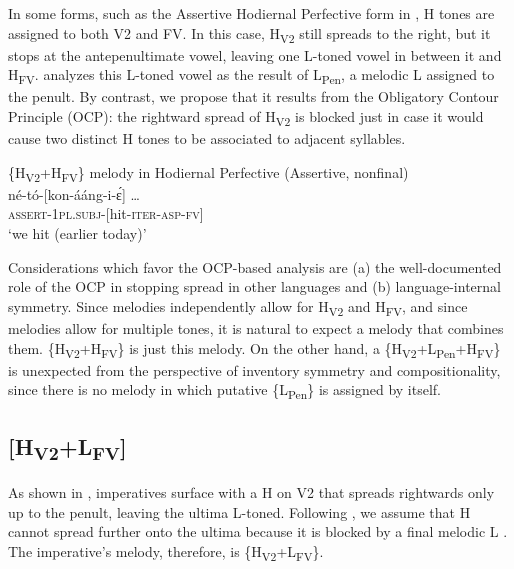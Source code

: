 \documentclass[output=paper,newtxmath,modfonts,nonflat,hidelinks]{langsci/langscibook}
\begin{document}
In some forms, such as the Assertive Hodiernal Perfective form in , H tones are assigned to both V2 and FV. In this case, H\textsubscript{V2} still spreads to the right, but it stops at the antepenultimate vowel, leaving one L-toned vowel in between it and H\textsubscript{FV}. \citet{Roberts-Kohno2014} analyzes this L-toned vowel as the result of L\textsubscript{Pen}, a melodic L  assigned to the penult. By contrast, we propose that it results from the Obligatory Contour Principle (OCP):  the rightward spread of H\textsubscript{V2} is blocked just in case it would cause two distinct H tones to be associated to adjacent syllables.

\ea\label{ex:jones:5}
{\{H\textsubscript{V2}+H\textsubscript{FV}\} melody in Hodiernal Perfective (Assertive, nonfinal)}\\
\gll né-tó-[kon-ááng-i-\'ɛ] …\\
     \textsc{assert-1pl.subj-[}hit-\textsc{iter-asp-fv]}\\
\glt ‘we hit (earlier today)’
\z

Considerations which favor the OCP-based analysis are 
(a) the well-doc\-u\-ment\-ed role of the OCP in stopping  spread in other  languages \citep[e.g.][]{Myers1997,Odden2014} and 
(b) language-internal symmetry. Since  melodies independently allow for H\textsubscript{V2} and H\textsubscript{FV}, and since  melodies allow for multiple tones, it is natural to expect a melody that combines them. \{H\textsubscript{V2}+H\textsubscript{FV}\} is just this melody. On the other hand, a \{H\textsubscript{V2}+L\textsubscript{Pen}+H\textsubscript{FV}\} is unexpected from the perspective of inventory symmetry and compositionality, since there is no melody in which putative \{L\textsubscript{Pen}\} is assigned by itself.


\subsection{[H\textsubscript{V2}+L\textsubscript{FV}]}\label{sec:jones:3.5}


As shown in ,  imperatives surface with a H  on V2 that spreads rightwards only up to the penult, leaving the ultima L-toned. Following \citet{Roberts-Kohno2014}, we assume that H cannot spread further onto the ultima because it is blocked by a final melodic L . The imperative’s melody, therefore, is \{H\textsubscript{V2}+L\textsubscript{FV}\}.
\end{document}
